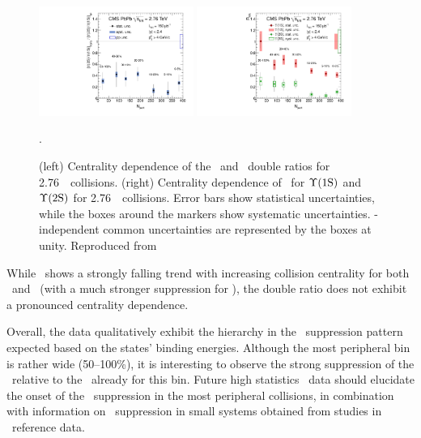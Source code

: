 \begin{figure}[t]
\begin{center}
   \includegraphics[width=0.45\textwidth]{qqbarfigures/chi2VsCent}
   \includegraphics[width=0.45\textwidth]{qqbarfigures/RaaPt4}
  \caption{(left) Centrality dependence of the \PgUa\ and \PgUb\ double ratios
for 2.76\TeV\ \PbPb\ collisions.  (right) Centrality dependence of \Raa\ 
for $\Upsilon\mathrm{(1S)}$ and $\Upsilon\mathrm{(2S)}$ for 2.76\TeV\ \PbPb\ collisions.
Error bars show statistical uncertainties, while the boxes around the markers
show systematic uncertainties. \npart-independent
common uncertainties are represented by the boxes at unity. Reproduced from~\cite{Chatrchyan:2012lxa}}.
\label{fig:GR:centrality}
\end{center}
\end{figure}

While \Raa\ shows a strongly falling trend with increasing collision centrality
for both \PgUa\ and \PgUb\ (with a much stronger suppression for \PgUb), the
double ratio does not exhibit a pronounced centrality dependence.

Overall, the data qualitatively exhibit the hierarchy in the \PgUn\ suppression pattern
expected based on the states' binding energies. Although the most peripheral bin
is rather wide (50--100\%), it is interesting to observe the strong suppression of the
\PgUb\ relative to the \PgUa\ already for this bin. Future high statistics \PbPb\ data
should elucidate the onset of the \PgU\ suppression in the most peripheral collisions,
in combination with information on \PgU\ suppression in small systems obtained from
studies in \pPb\ reference data.

